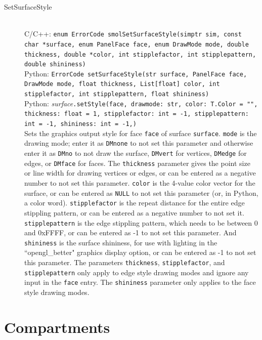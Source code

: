 \documentclass {scrbook}
\newcommand {\ttt} {\texttt}
\begin{document}
\begin{description}
\item[SetSurfaceStyle]
\hfill \\
C/C++: \ttt{enum ErrorCode smolSetSurfaceStyle(simptr sim, const char *surface, enum PanelFace face, enum DrawMode mode, double thickness, double *color, int stipplefactor, int stipplepattern, double shininess)}\\
Python: \ttt{ErrorCode setSurfaceStyle(str surface, PanelFace face, DrawMode mode, float thickness, List[float] color, int stipplefactor, int stipplepattern, float shininess)}\\
Python: \textit{surface}\ttt{.setStyle(face, drawmode: str, color: T.Color = "", thickness: float = 1, stipplefactor: int = -1, stipplepattern: int = -1, shininess: int = -1,)}\\
Sets the graphics output style for face \ttt{face} of surface \ttt{surface}. \ttt{mode} is the drawing mode; enter it as \ttt{DMnone} to not set this parameter and otherwise enter it as \ttt{DMno} to not draw the surface, \ttt{DMvert} for vertices, \ttt{DMedge} for edges, or \ttt{DMface} for faces. The \ttt{thickness} parameter gives the point size or line width for drawing vertices or edges, or can be entered as a negative number to not set this parameter. \ttt{color} is the 4-value color vector for the surface, or can be entered as \ttt{NULL} to not set this parameter (or, in Python, a color word). \ttt{stipplefactor} is the repeat distance for the entire edge stippling pattern, or can be entered as a negative number to not set it. \ttt{stipplepattern} is the edge stippling pattern, which needs to be between 0 and 0xFFFF, or can be entered as -1 to not set this parameter. And \ttt{shininess} is the surface shininess, for use with lighting in the ``opengl\_better" graphics display option, or can be entered as -1 to not set this parameter. The parameters \ttt{thickness}, \ttt{stipplefactor}, and \ttt{stipplepattern} only apply to edge style drawing modes and ignore any input in the \ttt{face} entry. The \ttt{shininess} parameter only applies to the face style drawing modes.

\end{description}

\section{Compartments}
\end{document}
